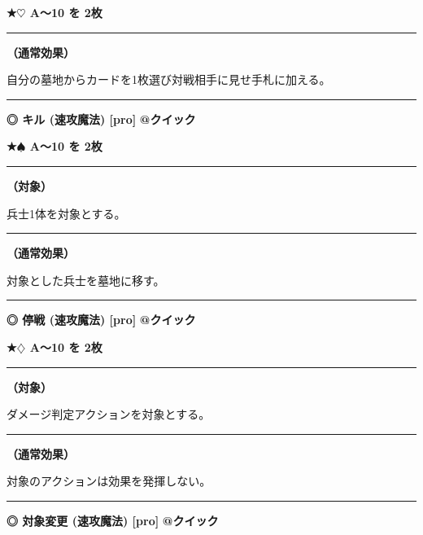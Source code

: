 \documentclass[twocolumn,a5paper,papersize,10pt]{jarticle}
\begin{document}
{\footnotesize\bf ★{\normalsize $\heartsuit$} A〜10 を 2枚}

\vspace{1mm}%
\hrule height 0.1mm depth 0mm width 66.5mm %
\vspace{1mm}%

{\bf（通常効果）}

自分の墓地からカードを1枚選び対戦相手に見せ手札に加える。
\vspace{2mm} %
\hrule height 0.5mm depth 0mm width 66.5mm %
\vspace{1mm} %
{\small\bf ◎ キル {\scriptsize (速攻魔法) [pro]}} %
\hfill 
{\footnotesize\bf @クイック }

{\footnotesize\bf ★{\normalsize $\spadesuit$} A〜10 を 2枚}

\vspace{1mm}%
\hrule height 0.1mm depth 0mm width 66.5mm %
\vspace{1mm}%
{\bf（対象）}

兵士1体を対象とする。
\vspace{1mm}%
\hrule height 0.1mm depth 0mm width 66.5mm %
\vspace{1mm}%

{\bf（通常効果）}

対象とした兵士を墓地に移す。
\vspace{2mm} %
\hrule height 0.5mm depth 0mm width 66.5mm %
\vspace{1mm} %
{\small\bf ◎ 停戦 {\scriptsize (速攻魔法) [pro]}} %
\hfill 
{\footnotesize\bf @クイック }

{\footnotesize\bf ★{\normalsize $\diamondsuit$} A〜10 を 2枚}

\vspace{1mm}%
\hrule height 0.1mm depth 0mm width 66.5mm %
\vspace{1mm}%
{\bf（対象）}

ダメージ判定アクションを対象とする。
\vspace{1mm}%
\hrule height 0.1mm depth 0mm width 66.5mm %
\vspace{1mm}%

{\bf（通常効果）}

対象のアクションは効果を発揮しない。
\vspace{2mm} %
\hrule height 0.5mm depth 0mm width 66.5mm %
\vspace{1mm} %
{\small\bf ◎ 対象変更 {\scriptsize (速攻魔法) [pro]}} %
\hfill 
{\footnotesize\bf @クイック }
\end{document}
